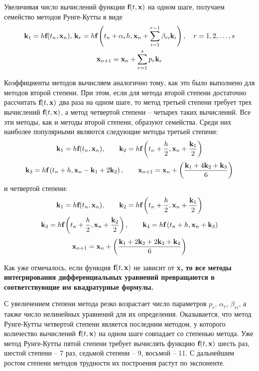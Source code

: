 Увеличивая число вычислений функции $\bf{f}(t, \bf{x})$ на одном шаге, получаем семейство методов Рунге-Кутты в виде
\begin{gather*}
    \bf{k}_1 = h\bf{f}(t_n, \bf{x}_n), \, \bf{k}_r = h\bf{f}\left( t_n + \alpha_r h, \bf{x}_n + \sum_{i=1}^{r-1} \beta_{ri}\bf{k}_i \right), \quad r=1,2,\ldots,s\\
    \bf{x}_{n+1} = \bf{x}_n + \sum_{r=1}^{s} p_r \bf{k}_r
\end{gather*}

Коэффициенты методов вычисляем аналогично тому, как это было выполнено для методов второй степени. При этом, если для
метода второй степени достаточно рассчитать $\bf{f}(t, \bf{x})$ два раза на одном шаге, то метод третьей степени требует
трех вычислений $\bf{f}(t, \bf{x})$, а метод четвертой степени -- четырех таких вычислений. Все эти методы, как и методы
второй степени, образуют семейства. Среди них наиболее популярными являются следующие методы третьей степени:
\begin{equation*}
    \bf{k}_1 = h\bf{f}(t_n, \bf{x}_n), \qquad \bf{k}_2 = h\bf{f}\left( t_n + \frac{h}{2}, \bf{x}_n + \frac{\bf{k}_1}{2} \right)
\end{equation*}
\begin{equation}
    \bf{k}_3 = h\bf{f}\left( t_n + h, \bf{x}_n - \bf{k}_1 + 2\bf{k}_2 \right), \qquad \bf{x}_{n+1} = \bf{x}_n + \left( \frac{\bf{k}_1 + 4\bf{k}_2 + \bf{k}_3}{6} \right)
\end{equation}
и четвертой степени:
\begin{gather*}
    \bf{k}_1 = h\bf{f}(t_n, \bf{x}_n), \qquad \bf{k}_2 = h\bf{f}\left( t_n + \frac{h}{2}, \bf{x}_n + \frac{\bf{k}_1}{2}\right) \\
    \bf{k}_3 = h\bf{f}\left( t_n + \frac{h}{2}, \bf{x}_n + \frac{\bf{k}_2}{2} \right), \qquad \bf{k}_4 = h\bf{f}\left( t_n + h, \bf{x}_n + \bf{k}_3 \right)
\end{gather*}
\begin{equation}
    \bf{x}_{n+1} = \bf{x}_n + \left( \frac{\bf{k}_1 + 2\bf{k}_2 + 2\bf{k}_3 + \bf{k}_4}{6} \right)
\end{equation}

Как уже отмечалось, если функция $\bf{f}(t, \bf{x})$ не зависит от \bf{x}, то все методы интегрирования дифференциальных
уравнений превращаются в соответствующие им квадратурные формулы.

С увеличением степени метода резко возрастает число параметров $p_r, \, \alpha_r, \, \beta_{ri}$, а также число нелинейных
уравнений для их определения. Оказывается, что метод Рунге-Кутты четвертой степени является последним методом, у которого
количество вычислений $\bf{f}(t, \bf{x})$ на одном шаге совпадает со степенью метода. Уже метод Рунге-Кутты пятой степени
требует вычислять функцию $\bf{f}(t, \bf{x})$ шесть раз, шестой степени -- 7 раз, седьмой степени -- 9, восьмой -- 11. С
дальнейшим ростом степени методов трудности их построения растут по экспоненте.

